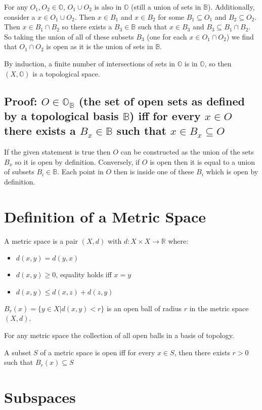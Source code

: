 \documentclass{homework}
\newcommand{\RR}{\mathbb{R}}
\newcommand{\BB}{\mathbb{B}}
\newcommand{\OO}{\mathbb{O}}
\begin{document}
For any $O_1,O_2 \in \OO$, $O_1 \cup O_2$ is also in $\OO$ (still a union of sets in $\BB$). Additionally, consider a $x \in O_1 \cup O_2$. Then $x \in B_1$ and $x \in B_2$ for some $B_1 \subseteq O_1$ and $B_2 \subseteq O_2$. Then $x \in B_1 \cap B_2$ so there exists a $B_3 \in \BB$ such that $x \in B_3$ and $B_3 \subseteq B_1 \cap B_2$. So taking the union of all of these subsets $B_3$ (one for each $x \in O_1 \cap O_2$) we find that $O_1 \cap O_2$ is open as it is the union of sets in $\BB$. 

By induction, a finite number of intersections of sets in $\OO$ is in $\OO$, so then $(X, \OO)$ is a topological space. 

\subsection{Proof: $O \in \OO_{\BB}$ (the set of open sets as defined by a topological basis $\BB$) iff for every $x \in O$ there exists a $B_x \in \BB$ such that $x \in B_x \subseteq O$}

If the given statement is true then $O$ can be constructed as the union of the sets $B_x$ so it is open by definition. Conversely, if $O$ is open then it is equal to a union of subsets $B_i \in \BB$. Each point in $O$ then is inside one of these $B_i$ which is open by definition.

\section{Definition of a Metric Space}

A metric space is a pair $(X,d)$ with $d: X \times X \rightarrow \RR$ where:
\begin{itemize}
    \item $d(x,y) = d(y,x)$
    \item $d(x,y) \ge 0$, equality holds iff $x = y$
    \item $d(x,y) \leq d(x,z) + d(z,y)$
\end{itemize}

$B_r(x) = \{y \in X|d(x,y) <r\}$ is an open ball of radius $r$ in the metric space $(X,d)$.

For any metric space the collection of all open balls in a basis of topology.

A subset $S$ of a metric space is open iff for every $x \in S$, then there exists $r>0$ such that $B_r(x) \subseteq S$

\section{Subspaces}
\end{document}
